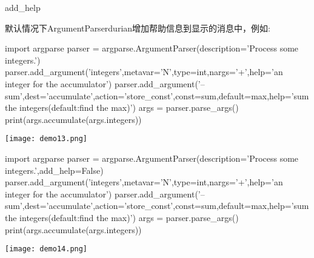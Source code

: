 add\_help\par
默认情况下ArgumentParserdurian增加帮助信息到显示的消息中，例如:
\begin{python}
import argparse
parser = argparse.ArgumentParser(description='Process some integers.')
parser.add_argument('integers',metavar='N',type=int,nargs='+',help='an integer for the accumulator')
parser.add_argument('--sum',dest='accumulate',action='store_const',const=sum,default=max,help='sum the integers(default:find the max)')
args = parser.parse_args()
print(args.accumulate(args.integers))
\end{python}
\texttt{[image: demo13.png]}
\begin{python}
import argparse
parser = argparse.ArgumentParser(description='Process some integers.',add_help=False)
parser.add_argument('integers',metavar='N',type=int,nargs='+',help='an integer for the accumulator')
parser.add_argument('--sum',dest='accumulate',action='store_const',const=sum,default=max,help='sum the integers(default:find the max)')
args = parser.parse_args()
print(args.accumulate(args.integers))
\end{python}
\texttt{[image: demo14.png]}
